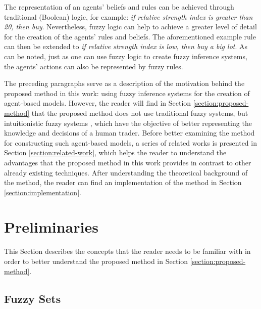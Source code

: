 \documentclass[review]{elsarticle}
\begin{document}
The representation of an agents' beliefs and rules can be achieved through
traditional (Boolean) logic, for example: \textit{if relative strength index is
greater than 20, then buy}. Nevertheless, fuzzy logic can help to achieve a
greater level of detail for the creation of the agents' rules and beliefs. The
aforementioned example rule can then be extended to \textit{if relative strength
index is low, then buy a big lot}. As can be noted, just as one can use fuzzy
logic to create fuzzy inference systems, the agents' actions can also be
represented by fuzzy rules.

The preceding paragraphs serve as a description of the motivation behind the
proposed method in this work: using fuzzy inference systems for the creation of
agent-based models. However, the reader will find in Section
\ref{section:proposed-method} that the proposed method does not use traditional
fuzzy systems, but intuitionistic fuzzy systems \cite{Atanassov1986}, which have
the objective of better representing the knowledge and decisions of a human
trader. Before better examining the method for constructing such agent-based
models, a series of related works is presented in Section
\ref{section:related-work}, which helps the reader to understand the advantages
that the proposed method in this work provides in contrast to other already
existing techniques. After understanding the theoretical background of the
method, the reader can find an implementation of the method in Section
\ref{section:implementation}.
%

\section{Preliminaries}
\label{section:preliminaries}
%

This Section describes the concepts that the reader needs to be familiar with in
order to better understand the proposed method in Section
\ref{section:proposed-method}.%

\subsection{Fuzzy Sets}
\label{subsection:fuzzy-sets}
\end{document}
